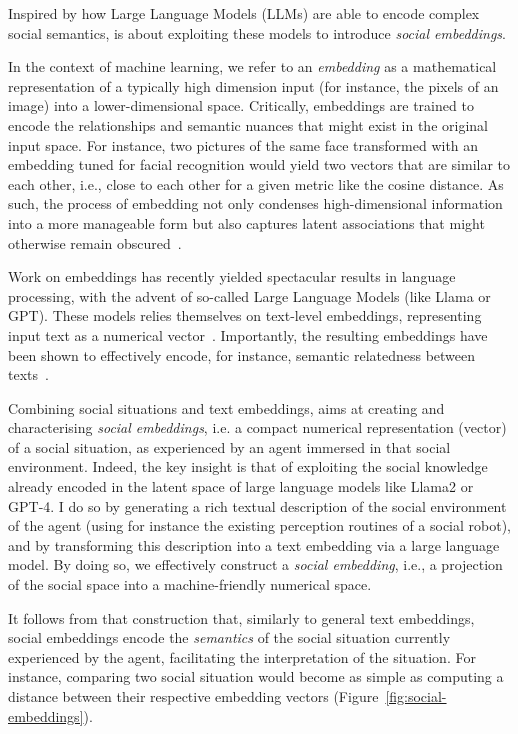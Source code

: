 Inspired by how Large Language Models (LLMs) are able to encode complex social
semantics, \project is about exploiting these models to introduce
\emph{social embeddings}.

In the context of machine learning, we refer to an \emph{embedding} as a
mathematical representation of a typically high dimension input (for instance,
the pixels of an image) into a lower-dimensional space. Critically, embeddings
are trained to encode the relationships and semantic nuances that might exist in
the original input space. For instance, two pictures of the same face
transformed with an embedding tuned for facial recognition would yield two
vectors that are similar to each other, i.e., close to each other for a given
metric like the cosine distance. As such, the process of embedding not
only condenses high-dimensional information into a more manageable form but also
captures latent associations that might otherwise remain
obscured~\cite{bengio2009learning}.

Work on embeddings has recently yielded spectacular results in language
processing, with the advent of so-called Large Language Models (like Llama or
GPT). These models relies themselves on text-level embeddings, representing
input text as a numerical
vector~\cite{reimers2019sentencebert,muennighoff2022sgpt}. Importantly, the
resulting embeddings have been shown to effectively encode, for instance,
semantic relatedness between texts~\cite{thakur2021beir}.

Combining social situations and text embeddings, \project aims at creating and
characterising \emph{social embeddings}, i.e. a compact numerical
representation (vector) of a social situation, as experienced by an agent
immersed in that social environment. 
Indeed, the key insight is that of
exploiting the social knowledge already encoded in the latent space of large
language models like Llama2 or GPT-4. I do so by generating a rich textual
description of the social environment of the agent (using for instance the
existing perception routines of a social robot), and by transforming this
description into a text embedding via a large language model.  By doing so, we
effectively construct a \emph{social embedding}, i.e., a projection of the
social space into a machine-friendly numerical space.

It follows from that construction that, similarly to general text embeddings,
social embeddings encode the \emph{semantics} of the social situation currently
experienced by the agent, facilitating the interpretation of the situation. For
instance, comparing two social situation would become as simple as computing a
distance between their respective embedding vectors
(Figure~\ref{fig:social-embeddings}).


